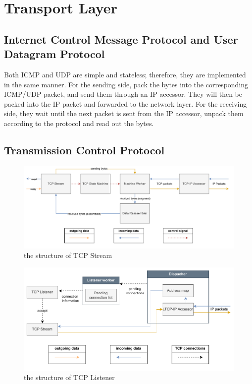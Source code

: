 \section{Transport Layer}
\subsection{Internet Control Message Protocol and User Datagram Protocol}
Both ICMP and UDP are simple and stateless; therefore, they are implemented in the same manner. For the sending side, pack the bytes into the corresponding ICMP/UDP packet, and send them through an IP accessor. They will then be packed into the IP packet and forwarded to the network layer. For the receiving side, they wait until the next packet is sent from the IP accessor, unpack them according to the protocol and read out the bytes.
\subsection{Transmission Control Protocol}
\begin{figure}[h]
  \begin{center}
    \centerline{\includegraphics[width=\columnwidth]{./figures/tcpstream.pdf}}
    \caption{the structure of TCP Stream}
    \label{tcpstream}
  \end{center}
\end{figure}
\begin{figure}[h]
  \begin{center}
    \centerline{\includegraphics[width=\columnwidth]{./figures/tcplistener}}
    \caption{the structure of TCP Listener}
    \label{tcplistener}
  \end{center}
\end{figure}

